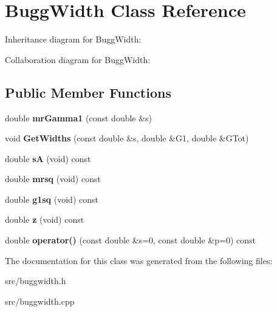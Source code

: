 \hypertarget{class_bugg_width}{}\section{Bugg\+Width Class Reference}
\label{class_bugg_width}


Inheritance diagram for Bugg\+Width\+:


Collaboration diagram for Bugg\+Width\+:
\subsection*{Public Member Functions}
\begin{DoxyCompactItemize}
\item 
\hypertarget{class_bugg_width_a9bcd0cd52923135347da06d29d8899d5}{}double {\bfseries mr\+Gamma1} (const double \&s)\label{class_bugg_width_a9bcd0cd52923135347da06d29d8899d5}

\item 
\hypertarget{class_bugg_width_aa3a3b2bc3c054864073492b3f983c50b}{}void {\bfseries Get\+Widths} (const double \&s, double \&G1, double \&G\+Tot)\label{class_bugg_width_aa3a3b2bc3c054864073492b3f983c50b}

\item 
\hypertarget{class_bugg_width_a8833b781cf63db8267d46e33c694393f}{}double {\bfseries s\+A} (void) const \label{class_bugg_width_a8833b781cf63db8267d46e33c694393f}

\item 
\hypertarget{class_bugg_width_ab2c18258fcc81e93587b250324f4805f}{}double {\bfseries mrsq} (void) const \label{class_bugg_width_ab2c18258fcc81e93587b250324f4805f}

\item 
\hypertarget{class_bugg_width_a4298c9eb5b0bfc84c567195b90c44e56}{}double {\bfseries g1sq} (void) const \label{class_bugg_width_a4298c9eb5b0bfc84c567195b90c44e56}

\item 
\hypertarget{class_bugg_width_abc73309dd0ea928e06f65571288ec3dc}{}double {\bfseries z} (void) const \label{class_bugg_width_abc73309dd0ea928e06f65571288ec3dc}

\item 
\hypertarget{class_bugg_width_a4ed2bb33e23cb28f4ce6ad2e271c0e1b}{}double {\bfseries operator()} (const double \&s=0, const double \&p=0) const \label{class_bugg_width_a4ed2bb33e23cb28f4ce6ad2e271c0e1b}

\end{DoxyCompactItemize}


The documentation for this class was generated from the following files\+:\begin{DoxyCompactItemize}
\item 
src/buggwidth.\+h\item 
src/buggwidth.\+cpp\end{DoxyCompactItemize}
